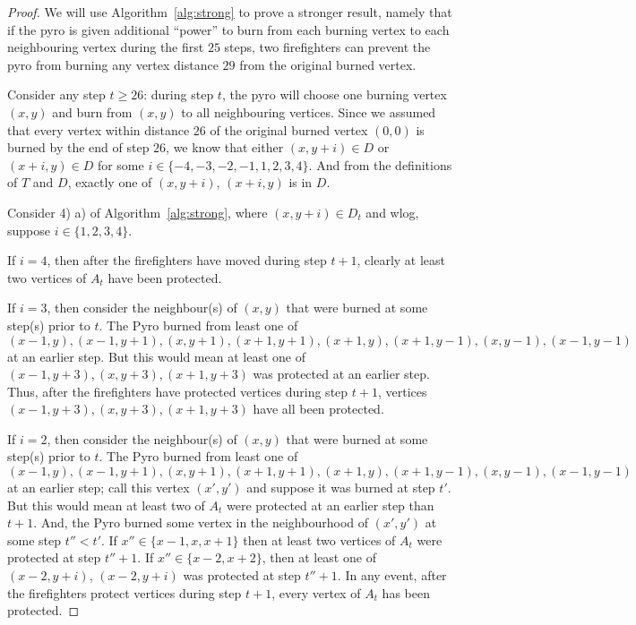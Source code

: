 \documentclass[12pt]{article}
\begin{document}
\begin{proof}We will use Algorithm~\ref{alg:strong} to prove a stronger result, namely that if the pyro is given additional ``power'' to burn from each burning vertex to each neighbouring vertex during the first $25$ steps, two firefighters can prevent the pyro from burning any vertex distance $29$ from the original burned vertex.\medskip

Consider any step $t \geq 26$: during step $t$, the pyro will choose one burning vertex $(x,y)$ and burn from $(x,y)$ to all neighbouring vertices.  Since we assumed that every vertex within distance $26$ of the original burned vertex $(0,0)$ is burned by the end of step $26$, we know that either $(x,y+i) \in D$ or $(x+i,y) \in D$ for some $i \in \{-4,-3,-2,-1,1,2,3,4\}$.  And from the definitions of $T$ and $D$, exactly one of $(x,y+i)$, $(x+i,y)$ is in $D$.\medskip

Consider 4) a) of Algorithm~\ref{alg:strong}, where $(x,y+i) \in D_t$ and wlog, suppose $i \in \{1,2,3,4\}$.\medskip  

If $i=4$, then after the firefighters have moved during step $t+1$, clearly at least two vertices of $A_t$ have been protected.\medskip
 
If $i=3$, then consider the neighbour(s) of $(x,y)$ that were burned at some step(s) prior to $t$.  The Pyro burned from least one of $(x-1,y),(x-1,y+1),(x,y+1),(x+1,y+1),(x+1,y),(x+1,y-1),(x,y-1),(x-1,y-1)$ at an earlier step.  But this would mean at least one of $(x-1,y+3),(x,y+3),(x+1,y+3)$ was protected at an earlier step.  Thus, after the firefighters have protected vertices during step $t+1$, vertices $(x-1,y+3),(x,y+3),(x+1,y+3)$ have all been protected.\medskip

If $i=2$, then consider the neighbour(s) of $(x,y)$ that were burned at some step(s) prior to $t$.  The Pyro burned from least one of $(x-1,y),(x-1,y+1),(x,y+1),(x+1,y+1),(x+1,y),(x+1,y-1),(x,y-1),(x-1,y-1)$ at an earlier step; call this vertex $(x',y')$ and suppose it was burned at step $t'$.   But this would mean at least two of $A_t$ were protected at an earlier step than $t+1$.  And, the Pyro burned some vertex in the neighbourhood of $(x',y')$ at some step $t''<t'$.  If $x'' \in \{x-1,x,x+1\}$ then at least two vertices of $A_t$ were protected at step $t''+1$.  If $x'' \in \{x-2,x+2\}$, then at least one of $(x-2,y+i)$, $(x-2,y+i)$ was protected at step $t''+1$.  In any event, after the firefighters protect vertices during step $t+1$, every vertex of $A_t$ has been protected.\medskip


\end{proof}
\end{document}
